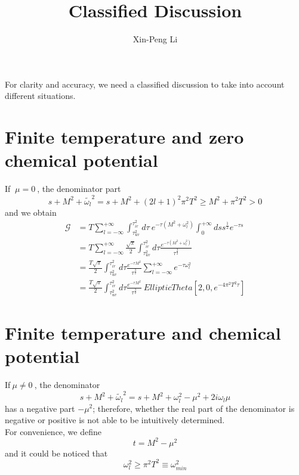 \documentclass{article}
\title{Classified Discussion}
\author{Xin-Peng Li}
\begin{document}
\maketitle
For clarity and accuracy, we need a classified discussion to take into account different situations.
\section{Finite temperature and zero chemical potential}
If $\ \mu=0\ $, the denominator part
\begin{equation}
    s+M^2+\widetilde{\omega_l}^2=s+M^2+\left(2l+1\right)^2\pi^2T^2 \geq M^2+\pi^2 T^2 >  0 
\end{equation}
and we obtain
\begin{equation}
    \begin{split}
        \mathcal{G} &=T \sum_{l=-\infty}^{+\infty} \int_{\tau_{uv}^2}^{\tau_{ir}^2}d\tau\ e^{-\tau \left(M^2+\omega_l^2\right)}  \int_{0}^{+\infty}ds  s^{\frac{1}{2}}e^{-\tau s}\\
        &=T\sum_{l=-\infty}^{+\infty}\frac{\sqrt{\pi}}{2}\int_{\tau_{uv}^2}^{\tau_{ir}^2}d\tau \frac{e^{-\tau\left(M^2+\omega_l^2\right)}}{\tau^{\frac{3}{2}}}\\
        &=\frac{T\sqrt{\pi}}{2}\int_{\tau_{uv}^2}^{\tau_{ir}^2}d\tau \frac{e^{-\tau M^2}}{\tau^{\frac{3}{2}}}\sum_{l=-\infty}^{+\infty}e^{-\tau \omega_l^2}\\
        &=\frac{T\sqrt{\pi}}{2}\int_{\tau_{uv}^2}^{\tau_{ir}^2}d\tau \frac{e^{-\tau M^2}}{\tau^{\frac{3}{2}}}\  EllipticTheta[2,0,e^{-4\pi^2 T^2 \tau}] 
    \end{split}
\end{equation}
\section{Finite temperature and chemical potential}
If$\ \mu\neq0\ $, the denominator
\begin{equation}
    s+M^2+\widetilde{\omega_l}^2=s+M^2+\omega_l^2-\mu^2+2i\omega_l\mu 
\end{equation}
has a negative part $ -\mu^2 $; therefore, whether the real part of the denominator is negative or positive is not able to be intuitively determined.
\\For convenience, we define
\begin{equation}
    t=M^2-\mu^2 
\end{equation}
and it could be noticed that
\begin{equation}
    \omega_l^2 \geq \pi^2 T^2\equiv \omega_{min}^2 
\end{equation}\
\end{document}
